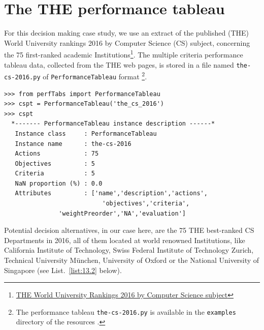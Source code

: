 \section{The THE performance tableau}
\label{sec:13.1}

For this decision making case study, we use an extract of the published \THE (THE) World University rankings 2016 by Computer Science (CS) subject, concerning the 75 first-ranked academic Institutions\footnote{\href{https://www.timeshighereducation.com/world-university-rankings/2017/subject-ranking/computer-science}{THE World University Rankings 2016 by Computer Science subject}}. The multiple criteria performance tableau data, collected from the THE web pages, is stored in a file named \texttt{the-cs-2016.py} of \texttt{PerformanceTableau} format \footnote{The performance tableau \texttt{the-cs-2016.py} is available in the \texttt{examples} directory of the \Digraph resources \citep{BIS-2021}.}. 
\begin{lstlisting}[caption={Performance tableau of the },label=list:13.1]
>>> from perfTabs import PerformanceTableau
>>> cspt = PerformanceTableau('the_cs_2016')
>>> cspt
  *------- PerformanceTableau instance description ------*
   Instance class     : PerformanceTableau
   Instance name      : the-cs-2016
   Actions            : 75
   Objectives         : 5
   Criteria           : 5
   NaN proportion (%) : 0.0
   Attributes         : ['name','description','actions',
                           'objectives','criteria',
			   'weightPreorder','NA','evaluation']
\end{lstlisting}

Potential decision alternatives, in our case here, are the 75 THE best-ranked CS Departments in 2016, all of them located at world renowned Institutions, like California Institute of Technology, Swiss Federal Institute of Technology Zurich, Technical University München, University of Oxford or the National University of Singapore (see List.~\vref{list:13.2} below). 

